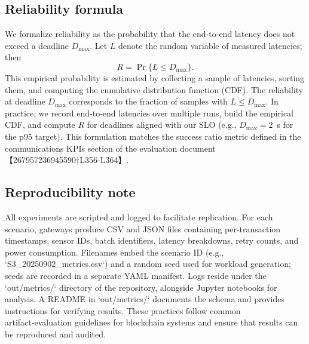 \documentclass[12pt,onecolumn]{IEEEtran} %
\begin{document}
\subsection{Reliability formula}
\label{sec:reliability-formula}
We formalize reliability as the probability that the end‑to‑end latency does not exceed a deadline $D_{\max}$.  Let $L$ denote the random variable of measured latencies; then
\begin{equation}
  R = \Pr\{L \le D_{\max}\}.
\end{equation}
This empirical probability is estimated by collecting a sample of latencies, sorting them, and computing the cumulative distribution function (CDF).  The reliability at deadline $D_{\max}$ corresponds to the fraction of samples with $L \le D_{\max}$.  In practice, we record end‑to‑end latencies over multiple runs, build the empirical CDF, and compute $R$ for deadlines aligned with our SLO (e.g., $D_{\max}=2$~s for the p95 target).  This formulation matches the success ratio metric defined in the communications KPIs section of the evaluation document【267957236945590†L356-L364】.

\subsection{Reproducibility note}
\label{sec:reproducibility}
All experiments are scripted and logged to facilitate replication.  For each scenario, gateways produce CSV and JSON files containing per‑transaction timestamps, sensor IDs, batch identifiers, latency breakdowns, retry counts, and power consumption.  Filenames embed the scenario ID (e.g., `S3_20250902_metrics.csv`) and a random seed used for workload generation; seeds are recorded in a separate YAML manifest.  Logs reside under the `out/metrics/` directory of the repository, alongside Jupyter notebooks for analysis.  A README in `out/metrics/` documents the schema and provides instructions for verifying results.  These practices follow common artifact‑evaluation guidelines for blockchain systems and ensure that results can be reproduced and audited.
\end{document}
